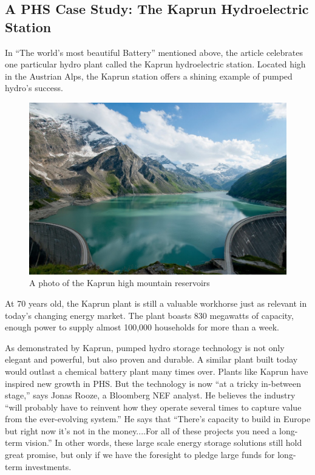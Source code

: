 \documentclass[hidelinks,12pt,a4paper]{article}
\begin{document}
\subsection{A PHS Case Study: The Kaprun Hydroelectric Station}
In “The world's most beautiful Battery” mentioned above, the article celebrates one particular hydro plant called the Kaprun hydroelectric station. Located high in the Austrian Alps, the Kaprun station offers a shining example of pumped hydro's success.


\begin{figure}[ht!]
    \centering
    \includegraphics[width=1\textwidth]{kaprun-hydroelectric-station-photo.jpeg}
    \caption{A photo of the Kaprun high mountain reservoirs \cite{MostBeautifulBattery}}
\end{figure}
\FloatBarrier

At 70 years old, the Kaprun plant is still a valuable workhorse just as relevant in today's changing energy market. The plant boasts 830 megawatts of capacity, enough power to supply almost 100,000 households for more than a week. \cite{MostBeautifulBattery}

As demonstrated by Kaprun, pumped hydro storage technology is not only elegant and powerful, but also proven and durable. A similar plant built today would outlast a chemical battery plant many times over. Plants like Kaprun have inspired new growth in PHS. But the technology is now “at a tricky in-between stage,” says Jonas Rooze, a Bloomberg NEF analyst. \cite{MostBeautifulBattery} He believes the industry “will probably have to reinvent how they operate several times to capture value from the ever-evolving system.” \cite{MostBeautifulBattery} He says that “There’s capacity to build in Europe but right now it’s not in the money....For all of these projects you need a long-term vision.” \cite{MostBeautifulBattery} In other words, these large scale energy storage solutions still hold great promise, but only if we have the foresight to pledge large funds for long-term investments.
\end{document}
